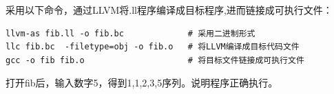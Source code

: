 \documentclass[UTF8,a4paper,10pt]{ctexart}
\begin{document}
采用以下命令，通过LLVM将.ll程序编译成目标程序,进而链接成可执行文件：
\begin{lstlisting}[frame=trbl]
llvm-as fib.ll -o fib.bc             # 采用二进制形式
llc fib.bc  -filetype=obj -o fib.o   # 将LLVM编译成目标代码文件
gcc -o fib fib.o                     # 将目标文件链接成可执行文件 
\end{lstlisting}\par
打开fib后，输入数字5，得到1,1,2,3,5序列。说明程序正确执行。
\newpage

 
\end{document}
